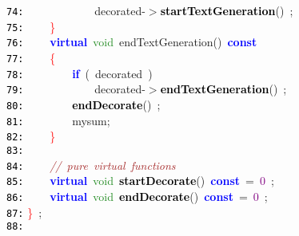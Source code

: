 \documentclass{article}
\begin{document}
\mbox{}\texttt{\textcolor{Black}{74:}} \ \ \ \ \ \ \ \ \ \ \ \ decorated\textcolor{BrickRed}{-$>$}\textbf{\textcolor{Black}{startTextGeneration}}\textcolor{BrickRed}{()}\ \textcolor{BrickRed}{;} \\
\mbox{}\texttt{\textcolor{Black}{75:}} \ \ \ \ \textcolor{Red}{\}} \\
\mbox{}\texttt{\textcolor{Black}{76:}} \ \ \ \ \textbf{\textcolor{Blue}{virtual}}\ \textcolor{ForestGreen}{void}\ \label{test.h:76}endTextGeneration\textcolor{BrickRed}{()}\ \textbf{\textcolor{Blue}{const}}\  \\
\mbox{}\texttt{\textcolor{Black}{77:}} \ \ \ \ \textcolor{Red}{\{}\  \\
\mbox{}\texttt{\textcolor{Black}{78:}} \ \ \ \ \ \ \ \ \textbf{\textcolor{Blue}{if}}\ \textcolor{BrickRed}{(}\ decorated\ \textcolor{BrickRed}{)} \\
\mbox{}\texttt{\textcolor{Black}{79:}} \ \ \ \ \ \ \ \ \ \ \ \ decorated\textcolor{BrickRed}{-$>$}\textbf{\textcolor{Black}{endTextGeneration}}\textcolor{BrickRed}{()}\ \textcolor{BrickRed}{;} \\
\mbox{}\texttt{\textcolor{Black}{80:}} \ \ \ \ \ \ \ \ \textbf{\textcolor{Black}{endDecorate}}\textcolor{BrickRed}{()}\ \textcolor{BrickRed}{;} \\
\mbox{}\texttt{\textcolor{Black}{81:}} \ \ \ \ \ \ \ \ mysum\textcolor{BrickRed}{;} \\
\mbox{}\texttt{\textcolor{Black}{82:}} \ \ \ \ \textcolor{Red}{\}} \\
\mbox{}\texttt{\textcolor{Black}{83:}}  \\
\mbox{}\texttt{\textcolor{Black}{84:}} \ \ \ \ \textit{\textcolor{Brown}{//\ pure\ virtual\ functions}} \\
\mbox{}\texttt{\textcolor{Black}{85:}} \ \ \ \ \textbf{\textcolor{Blue}{virtual}}\ \textcolor{ForestGreen}{void}\ \textbf{\textcolor{Black}{startDecorate}}\textcolor{BrickRed}{()}\ \textbf{\textcolor{Blue}{const}}\ \textcolor{BrickRed}{=}\ \textcolor{Purple}{0}\ \textcolor{BrickRed}{;} \\
\mbox{}\texttt{\textcolor{Black}{86:}} \ \ \ \ \textbf{\textcolor{Blue}{virtual}}\ \textcolor{ForestGreen}{void}\ \textbf{\textcolor{Black}{endDecorate}}\textcolor{BrickRed}{()}\ \textbf{\textcolor{Blue}{const}}\ \textcolor{BrickRed}{=}\ \textcolor{Purple}{0}\ \textcolor{BrickRed}{;} \\
\mbox{}\texttt{\textcolor{Black}{87:}} \textcolor{Red}{\}}\ \textcolor{BrickRed}{;} \\
\mbox{}\texttt{\textcolor{Black}{88:}}  \\
\end{document}
